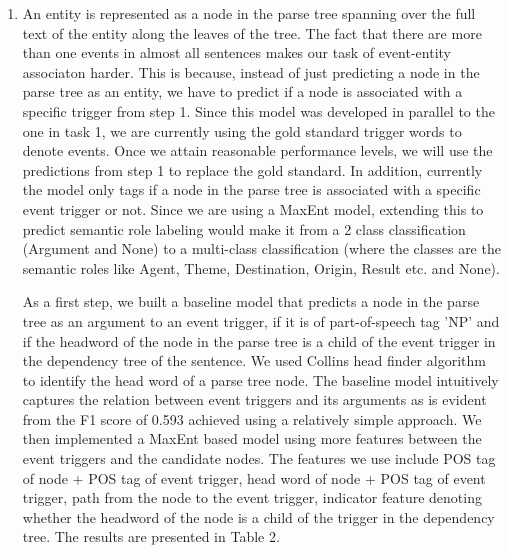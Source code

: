 \begin{enumerate}
\item {} An entity is represented as a node in the parse tree spanning over the full text of the entity along the leaves of the tree. The fact that there are more than one events in almost all sentences makes our task of event-entity associaton harder. This is because, instead of just predicting a node in the parse tree as an entity, we have to predict if a node is associated with a specific trigger from step 1. Since this model was developed in parallel to the one in task 1, we are currently using the gold standard trigger words to denote events. Once we attain reasonable performance levels, we will use the predictions from step 1 to replace the gold standard. In addition, currently the model only tags if a node in the parse tree is associated with a specific event trigger or not. Since we are using a MaxEnt model, extending this to predict semantic role labeling would make it from a 2 class classification (Argument and None) to a multi-class classification (where the classes are the semantic roles like Agent, Theme, Destination, Origin, Result etc. and None).

As a first step, we built a baseline model that predicts a node in the parse tree as an argument to an event trigger, if it is of part-of-speech tag 'NP' and if the headword of the node in the parse tree is a child of the event trigger in the dependency tree of the sentence. We used Collins head finder algorithm to identify the head word of a parse tree node. The baseline model intuitively captures the relation between event triggers and its arguments as is evident from the F1 score of 0.593 achieved using a relatively simple approach. We then implemented a MaxEnt based model using more features between the event triggers and the candidate nodes. The features we use include POS tag of node + POS tag of event trigger, head word of node + POS tag of event trigger, path from the node to the event trigger, indicator feature denoting whether the headword of the node is a child of the trigger in the dependency tree. The results are presented in Table 2.

\end{enumerate}